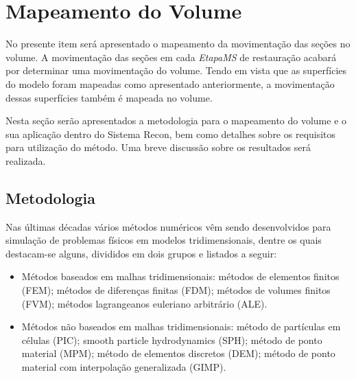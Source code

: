 
\section{Mapeamento do Volume}

No presente item será apresentado o mapeamento da movimentação das seções no volume. A movimentação das seções em cada \emph{EtapaMS} de restauração acabará por determinar uma movimentação do volume. Tendo em vista que as superfícies do modelo foram mapeadas como apresentado anteriormente, a movimentação dessas superfícies também é mapeada no volume.

Nesta seção serão apresentados a metodologia para o mapeamento do volume e o sua aplicação dentro do Sistema Recon, bem como detalhes sobre os requisitos para utilização do método. Uma breve discussão sobre os resultados será realizada.

\subsection{Metodologia}\label{vol-metodology}

Nas últimas décadas vários métodos numéricos vêm sendo desenvolvidos para simulação de problemas físicos em modelos tridimensionais, dentre os quais destacam-se alguns, divididos em dois grupos e listados a seguir:

\renewcommand{\labelitemi}{•}
\begin{itemize}
  \item Métodos baseados em malhas tridimensionais: métodos de elementos finitos (FEM)\cite{MEF}; métodos de diferenças finitas (FDM)\cite{MDF}; métodos de volumes finitos (FVM)\cite{MVF}; métodos lagrangeanos euleriano arbitrário (ALE)\cite{ALE}.
  \item Métodos não baseados em malhas tridimensionais: método de partículas em células (PIC)\cite{PIC}; smooth particle hydrodynamics (SPH)\cite{SPH}; método de ponto material (MPM)\cite{MPM}; método de elementos discretos (DEM)\cite{DEM}; método de ponto material com interpolação generalizada (GIMP)\cite{GIMP,MullerGIMP}.
\end{itemize}

